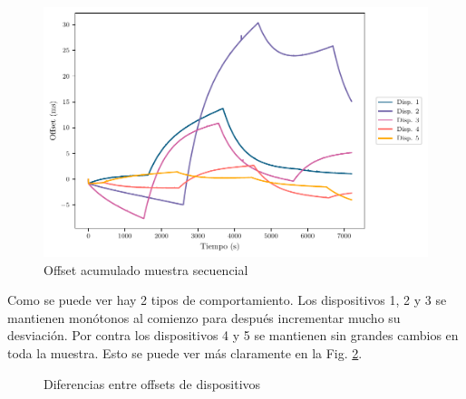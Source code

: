 \begin{figure}
    \centering
    \includegraphics[scale=0.65]{../Python/plots/individual/offset_plot}
    \caption{Offset acumulado muestra secuencial}
    \label{fig:off_acu_secuencial}
\end{figure}

Como se puede ver hay 2 tipos de comportamiento. Los dispositivos 1, 2 y 3 se mantienen monótonos al comienzo para después incrementar mucho su desviación. Por contra los dispositivos 4 y 5 se mantienen sin grandes cambios en toda la muestra. Esto se puede ver más claramente en la Fig. \ref{fig:off_acu_secuencial_diffs}.

\begin{figure}
    \centering
    \quad
    \caption{Diferencias entre offsets de dispositivos}
    \label{fig:off_acu_secuencial_diffs}
\end{figure}

